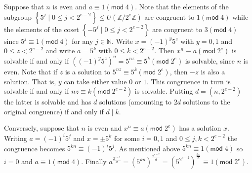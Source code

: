 \documentclass[12pt]{article}
\renewcommand{\pmod}[1]{\left(\mathsf{mod}\;#1\right)}
\begin{document}
\begin{enumerate}
Suppose that $n$ is even and $a\equiv 1\pmod{4}$.
Note that the elements of the subgroup
$\left\{5^j\mid 0\le j<2^{e-2}\right\}
\le U\left(\mathbb{Z}/2^e\mathbb{Z}\right)$
are congruent to $1\pmod{4}$
while the elements of the coset
$\left\{-5^j\mid 0\le j<2^{e-2}\right\}$
are congruent to $3\pmod{4}$
since $5^j\equiv 1\pmod{4}$ for any $j\in\mathbb{N}$.
Write $x=\left(-1\right)^y5^z$ with $y=0,1$ and $0\le z<2^{e-2}$ and
write $a=5^k$ with $0\le k<2^{e-2}$.
Then $x^n\equiv a\pmod{2^e}$ is solvable if and only if
$\left(\left(-1\right)^y5^z\right)^n=5^{nz}
\equiv 5^k\pmod{2^e}$ is solvable, since $n$ is even.
Note that if $z$ is a solution to
$5^{nz}\equiv 5^k\pmod{2^e}$, then $-z$ is also a solution.
That is, $y$ can take either value $0$ or $1$.
This congruence in turn is solvable
if and only if $nz\equiv k\pmod{2^{e-2}}$ is solvable.
Putting $d=\left(n,2^{e-2}\right)$ the latter
is solvable and has $d$ solutions (amounting to $2d$ solutions
to the original conguence)
if and only if $d\mid k$.

Conversely, suppose that $n$ is even
and $x^n\equiv a\pmod{2^e}$ has a solution $x$.
Writing $a=\left(-1\right)^i5^j$ and $x=\pm 5^k$
for some $i=0,1$ and $0\le j,k<2^{e-2}$ the congruence
becomes $5^{kn}\equiv\left(-1\right)^i5^j$.
As mentioned above $5^{kn}\equiv 1\pmod{4}$
so $i=0$ and $a\equiv 1\pmod{4}$.
Finally $a^{\frac{2^{e-2}}{d}}=\left(5^{kn}\right)^{\frac{2^{e-2}}{d}}
=\left(5^{2^{e-2}}\right)^{\frac{kn}{d}}\equiv 1\pmod{2^e}$.
\end{enumerate}
\end{document}
